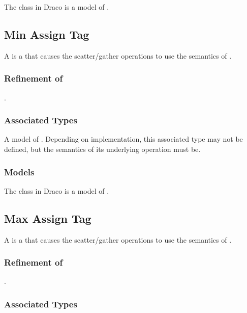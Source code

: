 \documentclass[note]{newmemo}
\begin{document}
The  class in Draco is a model of
.

\bigskip

\subsection{Min Assign Tag}

A  is a  that
causes the  scatter/gather operations to use
the semantics of .

\subsubsection{Refinement of}
.

\subsubsection{Associated Types}

A model of . Depending on implementation, this
associated type may not be defined, but the semantics of its
underlying operation must be.

\subsubsection{Models}

The  class in Draco is a model of
.

\newpage

\subsection{Max Assign Tag}

A  is a  that
causes the  scatter/gather operations to use
the semantics of .

\subsubsection{Refinement of}
.

\subsubsection{Associated Types}
\end{document}
